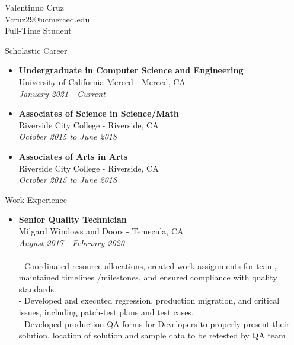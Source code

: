 \documentclass[11pt]{article}
\begin{document}
\begin{center}
    {\Large Valentinno Cruz\\
    Vcruz29@ucmerced.edu\\
    Full-Time Student\\}

\end{center}




\begin{flushleft}
{\huge Scholastic Career}
\end{flushleft}


\begin{itemize}

\item \textbf{Undergraduate in Computer Science and Engineering}\\
University of California Merced - Merced, CA\\
\emph{January 2021 - Current}

\item \textbf{Associates of Science in Science/Math}\\
Riverside City College - Riverside, CA\\
\emph{October 2015 to June 2018}

\item \textbf{Associates of Arts in Arts}\\
Riverside City College - Riverside, CA\\
\emph{October 2015 to June 2018}

\end{itemize}


\begin{flushleft}
{\huge Work Experience}
\end{flushleft}

\begin{itemize}

\item \textbf{Senior Quality Technician}\\
Milgard Windows and Doors - Temecula, CA\\
\emph{August 2017 - February 2020}\\
\\
-	Coordinated resource allocations, created work assignments for team, maintained timelines /milestones, and ensured compliance with quality standards.\\
-	Developed and executed regression, production migration, and critical issues, including patch-test plans and test cases.\\
-	Developed production QA forms for Developers to properly present their solution, location of solution and sample data to be retested by QA team\\

\end{itemize}
\end{document}
